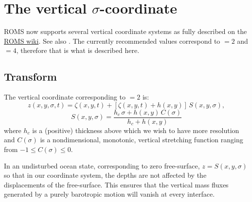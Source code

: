 \section{The vertical $\sigma$-coordinate}
\label{Scoord}

ROMS now supports several vertical coordinate systems as fully
described on the
\href{https://www.myroms.org/wiki/index.php/Vertical_S-coordinate}{ROMS
wiki}. See also \cite{SS2005}. The
currently recommended values correspond to $=2$
and $=4$, therefore that is what is described here.

\subsection{Transform}
The vertical coordinate corresponding to $=2$ is:
\begin{equation}
     z(x,y,\sigma,t) = \zeta(x,y,t) + \left[\zeta(x,y,t) +
     h(x,y)\right] \, S(x,y,\sigma),
\end{equation}
\begin{equation}
     S(x,y,\sigma) = \frac{h_c \, \sigma + h(x,y)\,
          C(\sigma)}{h_c + h(x,y)}
\end{equation}
where $h_c$ is a (positive) thickness above
which we wish to have more resolution and $C(\sigma)$ is a
nondimensional, monotonic, vertical
stretching function ranging from $-1 \le C(\sigma) \le 0$.

In an undisturbed ocean state, corresponding to zero free-surface,
$z=S(x,y,\sigma)$ so that in our coordinate system, the depths are not
affected by the displacements of the free-surface.  This ensures that
the vertical mass fluxes generated by a purely barotropic motion will
vanish at every interface.


